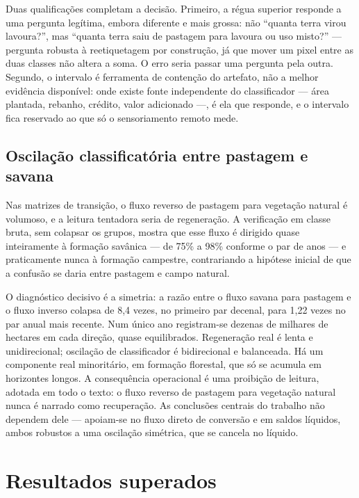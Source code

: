 Duas qualificações completam a decisão. Primeiro, a régua superior responde
a uma pergunta legítima, embora diferente e mais grossa: não ``quanta terra
virou lavoura?'', mas ``quanta terra saiu de pastagem para lavoura ou uso
misto?'' --- pergunta robusta à reetiquetagem por construção, já que mover
um pixel entre as duas classes não altera a soma. O erro seria passar uma
pergunta pela outra. Segundo, o intervalo é ferramenta de contenção do
artefato, não a melhor evidência disponível: onde existe fonte independente
do classificador --- área plantada, rebanho, crédito, valor adicionado ---,
é ela que responde, e o intervalo fica reservado ao que só o sensoriamento
remoto mede.

\subsection{Oscilação classificatória entre pastagem e savana}
\label{ap:oscilacao}

Nas matrizes de transição, o fluxo reverso de pastagem para vegetação
natural é volumoso, e a leitura tentadora seria de regeneração. A
verificação em classe bruta, sem colapsar os grupos, mostra que esse fluxo
é dirigido quase inteiramente à formação savânica --- de 75\% a 98\%
conforme o par de anos --- e praticamente nunca à formação campestre,
contrariando a hipótese inicial de que a confusão se daria entre pastagem e
campo natural.

O diagnóstico decisivo é a simetria: a razão entre o fluxo savana para
pastagem e o fluxo inverso colapsa de 8,4 vezes, no primeiro par decenal,
para 1,22 vezes no par anual mais recente. Num único ano registram-se
dezenas de milhares de hectares em cada direção, quase equilibrados.
Regeneração real é lenta e unidirecional; oscilação de classificador é
bidirecional e balanceada. Há um componente real minoritário, em formação
florestal, que só se acumula em horizontes longos. A consequência
operacional é uma proibição de leitura, adotada em todo o texto: o fluxo
reverso de pastagem para vegetação natural nunca é narrado como recuperação.
As conclusões centrais do trabalho não dependem dele --- apoiam-se no fluxo
direto de conversão e em saldos líquidos, ambos robustos a uma oscilação
simétrica, que se cancela no líquido.

\section{Resultados superados}
\label{ap:superados}


